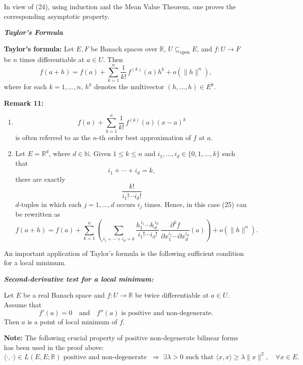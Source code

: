 \documentclass{book}
\begin{document}
In view of (24), using induction and the Mean Value Theorem,
one proves the corresponding asymptotic property.

\begin{center}
    \textbf{\textit{Taylor's Formula}}
\end{center}

\textbf{Taylor's formula:}
Let $E,F$ be Banach spaces over $\mathbb{R}$,
$U \subseteq_{\mathrm{open}} E$, and $f : U \to F$ be $n$ times differentiable at $a \in U$.
Then
\[
f(a+h)
=
f(a)
+
\sum_{k=1}^{n}
\frac{1}{k!}\, f^{(k)}(a)h^k
+
o(\|h\|^n),
\tag{25}
\]
where for each $k=1,\dots,n$, $h^k$ denotes the multivector $(h,\dots,h) \in E^k$.

\bigskip

\textbf{Remark 11:}

\begin{enumerate}
\item
\[
f(a)
+
\sum_{k=1}^{n}
\frac{1}{k!}\, f^{(k)}(a)(x-a)^k
\]
is often referred to as the $n$-th order best approximation of $f$ at $a$.

\item
Let $E=\mathbb{R}^d$, where $d \in \mathbb{N}$.
Given $1 \le k \le n$ and $i_1,\dots,i_d \in \{0,1,\dots,k\}$ such that
\[
i_1+\cdots+i_d = k,
\]
there are exactly
\[
\frac{k!}{i_1!\cdots i_d!}
\]
$d$-tuples in which each $j=1,\dots,d$ occurs $i_j$ times.
Hence, in this case (25) can be rewritten as
\[
f(a+h)
=
f(a)
+
\sum_{k=1}^{n}
\left(
\sum_{i_1+\cdots+i_d=k}
\frac{h_1^{\,i_1}\cdots h_d^{\,i_d}}{i_1!\cdots i_d!}
\,
\frac{\partial^k f}{\partial x_1^{i_1}\cdots\partial x_d^{i_d}}(a)
\right)
+
o(\|h\|^n).
\]
\end{enumerate}

\bigskip

An important application of Taylor's formula is the following sufficient condition for a local minimum.

\medskip

\textbf{\textit{Second-derivative test for a local minimum:}}

Let $E$ be a real Banach space and $f : U \to \mathbb{R}$ be twice differentiable at $a \in U$.
Assume that
\[
f'(a)=0
\quad \text{and} \quad
f''(a)
\text{ is positive and non-degenerate}.
\]
Then $a$ is a point of local minimum of $f$.

\medskip

\textbf{Note:}
The following crucial property of positive non-degenerate bilinear forms
has been used in the proof above:
\[
\langle \cdot , \cdot \rangle \in L(E,E;\mathbb{R})
\text{ positive and non-degenerate }
\;\Longrightarrow\;
\exists \lambda>0 \text{ such that }
\langle x,x\rangle \ge \lambda \|x\|^2,
\quad \forall x \in E.
\tag{26}
\]
\end{document}

